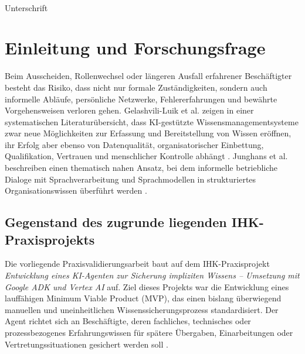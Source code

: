 \documentclass[
  10pt,
  ngerman,
  a4paper,
  toc=graduated,
  numbers=noenddot,
  headings=standardclasses,
  nonumberlist
]{scrartcl}
\begin{document}
\vspace{2cm}
\hrulefill\\
Unterschrift

\newpage
\listoffigures
{}

\newpage
\listoftables
{}

\newpage
{}
\setcounter{page}{1}

\section{Einleitung und Forschungsfrage}

Beim Ausscheiden, Rollenwechsel oder längeren Ausfall erfahrener Beschäftigter besteht das Risiko, dass nicht nur formale Zuständigkeiten, sondern auch informelle Abläufe, persönliche Netzwerke, Fehlererfahrungen und bewährte Vorgehensweisen verloren gehen. Gelashvili-Luik et al. zeigen in einer systematischen Literaturübersicht, dass KI-gestützte Wissensmanagementsysteme zwar neue Möglichkeiten zur Erfassung und Bereitstellung von Wissen eröffnen, ihr Erfolg aber ebenso von Datenqualität, organisatorischer Einbettung, Qualifikation, Vertrauen und menschlicher Kontrolle abhängt \cite{gelashvili2025}. Junghans et al. beschreiben einen thematisch nahen Ansatz, bei dem informelle betriebliche Dialoge mit Sprachverarbeitung und Sprachmodellen in strukturiertes Organisationswissen überführt werden \cite{junghans2026}.

\subsection{Gegenstand des zugrunde liegenden IHK-Praxisprojekts}

Die vorliegende Praxisvalidierungsarbeit baut auf dem IHK-Praxisprojekt \emph{Entwicklung eines KI-Agenten zur Sicherung impliziten Wissens -- Umsetzung mit Google ADK und Vertex AI} auf. Ziel dieses Projekts war die Entwicklung eines lauffähigen Minimum Viable Product (MVP), das einen bislang überwiegend manuellen und uneinheitlichen Wissenssicherungsprozess standardisiert. Der Agent richtet sich an Beschäftigte, deren fachliches, technisches oder prozessbezogenes Erfahrungswissen für spätere Übergaben, Einarbeitungen oder Vertretungssituationen gesichert werden soll \cite[S.~1--2]{sommer2026projekt}.
\end{document}
